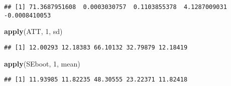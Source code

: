 \documentclass[]{article}
\newenvironment{Shaded}{\begin{snugshade}}{\end{snugshade}}
\newcommand{\KeywordTok}[1]{\textcolor[rgb]{0.13,0.29,0.53}{\textbf{#1}}}
\newcommand{\DecValTok}[1]{\textcolor[rgb]{0.00,0.00,0.81}{#1}}
\newcommand{\NormalTok}[1]{#1}
\begin{document}
\begin{verbatim}
## [1] 71.3687951608  0.0003030757  0.1103855378  4.1287009031 -0.0008410053
\end{verbatim}

\begin{Shaded}
\begin{Highlighting}[]
\KeywordTok{apply}\NormalTok{(ATT, }\DecValTok{1}\NormalTok{, sd)}
\end{Highlighting}
\end{Shaded}

\begin{verbatim}
## [1] 12.00293 12.18383 66.10132 32.79879 12.18419
\end{verbatim}

\begin{Shaded}
\begin{Highlighting}[]
\KeywordTok{apply}\NormalTok{(SEboot, }\DecValTok{1}\NormalTok{, mean)}
\end{Highlighting}
\end{Shaded}

\begin{verbatim}
## [1] 11.93985 11.82235 48.30555 23.22371 11.82418
\end{verbatim}
\end{document}
